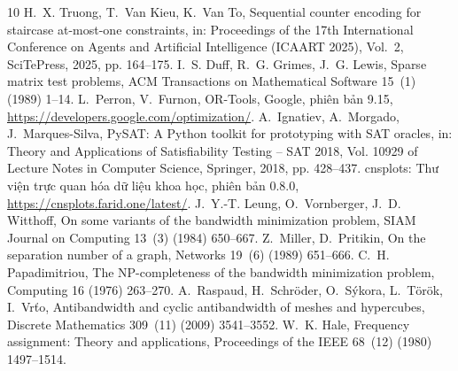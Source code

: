 \documentclass[a4paper,fleqn]{cas-sc}
\begin{document}
\nocite{*}
\begin{thebibliography}{10}
H.~X. Truong, T.~Van Kieu, K.~Van To, Sequential counter encoding for staircase at-most-one constraints, in: Proceedings of the 17th International Conference on Agents and Artificial Intelligence (ICAART 2025), Vol.~2, SciTePress, 2025, pp. 164--175.
I.~S. Duff, R.~G. Grimes, J.~G. Lewis, Sparse matrix test problems, ACM Transactions on Mathematical Software 15~(1) (1989) 1--14.
L.~Perron, V.~Furnon, OR-Tools, Google, phiên bản 9.15, \url{https://developers.google.com/optimization/}.
A.~Ignatiev, A.~Morgado, J.~Marques-Silva, PySAT: A Python toolkit for prototyping with SAT oracles, in: Theory and Applications of Satisfiability Testing -- SAT 2018, Vol. 10929 of Lecture Notes in Computer Science, Springer, 2018, pp. 428--437.
cnsplots: Thư viện trực quan hóa dữ liệu khoa học, phiên bản 0.8.0, \url{https://cnsplots.farid.one/latest/}.
J.~Y.-T. Leung, O.~Vornberger, J.~D. Witthoff, On some variants of the bandwidth minimization problem, SIAM Journal on Computing 13~(3) (1984) 650--667.
Z.~Miller, D.~Pritikin, On the separation number of a graph, Networks 19~(6) (1989) 651--666.
C.~H. Papadimitriou, The NP-completeness of the bandwidth minimization problem, Computing 16 (1976) 263--270.
A.~Raspaud, H.~Schr\"{o}der, O.~S\'{y}kora, L.~T\"{o}r\"{o}k, I.~Vr\v{t}o, Antibandwidth and cyclic antibandwidth of meshes and hypercubes, Discrete Mathematics 309~(11) (2009) 3541--3552.
W.~K. Hale, Frequency assignment: Theory and applications, Proceedings of the IEEE 68~(12) (1980) 1497--1514.
\end{thebibliography}
\end{document}
